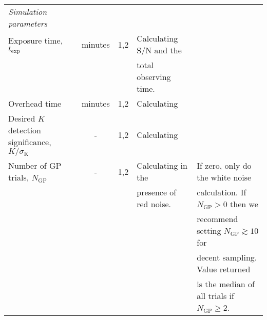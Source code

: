 \begin{landscape}
\begin{table*}
\begin{tabular}{lccll}
    \emph{Simulation parameters} & & & \\
    Exposure time, $t_{\text{exp}}$ & minutes & 1,2 & Calculating S/N and the & \\ &&& total observing time. & \\
    Overhead time & minutes & 1,2 & Calculating \sigRV{.} & \\
    Desired $K$ detection significance, $K/\sigma_{\text{K}}$ & - & 1,2 & Calculating \nrv{.} & \\
    Number of GP trials, $N_{\text{GP}}$ & - & 1,2 & Calculating \nrv{} in the & If zero, only do the white noise \\ &&& presence of red noise. & calculation. If $N_{\text{GP}}>0$ then we \\ &&&& recommend setting $N_{\text{GP}} \gtrsim 10$ for \\ &&&& decent sampling. Value returned \\ &&&& is the median of all trials if $N_{\text{GP}}\geq 2$.
  \end{tabular}
\end{table*}
\clearpage
\end{landscape}
